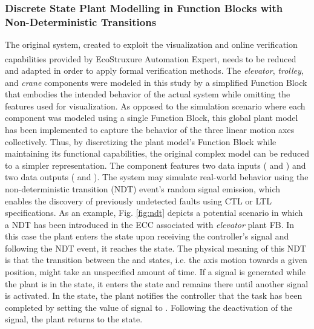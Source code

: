 \documentclass{ieeeojies}
\begin{document}
\subsubsection*{Discrete State Plant Modelling in Function Blocks with Non-Deterministic Transitions}
The original system, created to exploit the visualization and online verification capabilities provided by EcoStruxure\textsuperscript{\texttrademark} Automation Expert, needs to be reduced and adapted in order to apply formal verification methods. The \textit{elevator}, \textit{trolley}, and \textit{crane} components were modeled in this study by a simplified Function Block that embodies the intended behavior of the actual system while omitting the features used for visualization. As opposed to the simulation scenario where each component was modeled using a single Function Block, this global plant model has been implemented to capture the behavior of the three linear motion axes collectively.
Thus, by discretizing the plant model's Function Block while maintaining its functional capabilities, the original complex model can be reduced to a simpler representation.
The  component features two data inputs ( and ) and two data outputs ( and ).
The system may simulate real-world behavior using the non-deterministic transition (NDT) event's random signal emission, which enables the discovery of previously undetected faults using CTL or LTL specifications.
As an example, Fig. \ref{fig:ndt} depicts a potential scenario in which a NDT has been introduced in the ECC associated with \textit{elevator} plant FB.
In this case the plant enters the  state upon receiving the controller's  signal and following the NDT event, it reaches the  state.
The physical meaning of this NDT is that the transition between the  and  states, i.e. the axis motion towards a given position, might take an unspecified amount of time.
If a  signal is generated while the plant is in the  state, it enters the  state and remains there until another  signal is activated.
In the  state, the plant notifies the controller that the task has been completed by setting the value of   signal to . 
Following the deactivation of the  signal, the plant returns to the  state.
\end{document}
